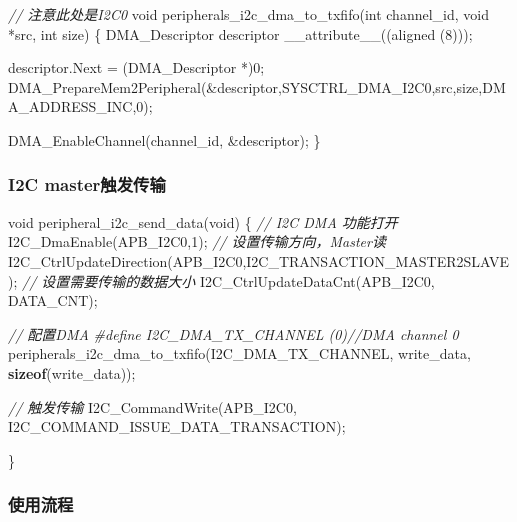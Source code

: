 \documentclass[
  12pt,
]{book}
\newenvironment{Shaded}{\begin{snugshade}}{\end{snugshade}}
\newcommand{\CommentTok}[1]{\textcolor[rgb]{0.56,0.35,0.01}{\textit{#1}}}
\newcommand{\DataTypeTok}[1]{\textcolor[rgb]{0.13,0.29,0.53}{#1}}
\newcommand{\DecValTok}[1]{\textcolor[rgb]{0.00,0.00,0.81}{#1}}
\newcommand{\KeywordTok}[1]{\textcolor[rgb]{0.13,0.29,0.53}{\textbf{#1}}}
\newcommand{\NormalTok}[1]{#1}
\newcommand{\PreprocessorTok}[1]{\textcolor[rgb]{0.56,0.35,0.01}{\textit{#1}}}
\begin{document}
\begin{Shaded}
\begin{Highlighting}[]
\CommentTok{// 注意此处是I2C0}
\DataTypeTok{void}\NormalTok{ peripherals_i2c_dma_to_txfifo(}\DataTypeTok{int}\NormalTok{ channel_id, }\DataTypeTok{void}\NormalTok{ *src, }\DataTypeTok{int}\NormalTok{ size)}
\NormalTok{\{}
\NormalTok{    DMA_Descriptor descriptor __attribute__((aligned (}\DecValTok{8}\NormalTok{)));}

\NormalTok{    descriptor.Next = (DMA_Descriptor *)}\DecValTok{0}\NormalTok{;}
\NormalTok{    DMA_PrepareMem2Peripheral(&descriptor,SYSCTRL_DMA_I2C0,src,size,DMA_ADDRESS_INC,}\DecValTok{0}\NormalTok{);}

\NormalTok{    DMA_EnableChannel(channel_id, &descriptor);}
\NormalTok{\}}
\end{Highlighting}
\end{Shaded}

\hypertarget{i2c-masterux89e6ux53d1ux4f20ux8f93-3}{%
\subsubsection{I2C master触发传输}\label{i2c-masterux89e6ux53d1ux4f20ux8f93-3}}

\begin{Shaded}
\begin{Highlighting}[]
\DataTypeTok{void}\NormalTok{ peripheral_i2c_send_data(}\DataTypeTok{void}\NormalTok{)}
\NormalTok{\{}
  \CommentTok{// I2C DMA 功能打开}
\NormalTok{  I2C_DmaEnable(APB_I2C0,}\DecValTok{1}\NormalTok{);}
  \CommentTok{// 设置传输方向，Master读}
\NormalTok{  I2C_CtrlUpdateDirection(APB_I2C0,I2C_TRANSACTION_MASTER2SLAVE);}
  \CommentTok{// 设置需要传输的数据大小}
\NormalTok{  I2C_CtrlUpdateDataCnt(APB_I2C0, DATA_CNT);}

  \CommentTok{// 配置DMA}
  \PreprocessorTok{#define I2C_DMA_TX_CHANNEL   (0)}\CommentTok{//DMA channel 0}
\NormalTok{  peripherals_i2c_dma_to_txfifo(I2C_DMA_TX_CHANNEL, write_data, }\KeywordTok{sizeof}\NormalTok{(write_data));}
  
  \CommentTok{// 触发传输}
\NormalTok{  I2C_CommandWrite(APB_I2C0, I2C_COMMAND_ISSUE_DATA_TRANSACTION);}
  
\NormalTok{\}}
\end{Highlighting}
\end{Shaded}

\hypertarget{ux4f7fux7528ux6d41ux7a0b-6}{%
\subsubsection{使用流程}\label{ux4f7fux7528ux6d41ux7a0b-6}}
\end{document}
